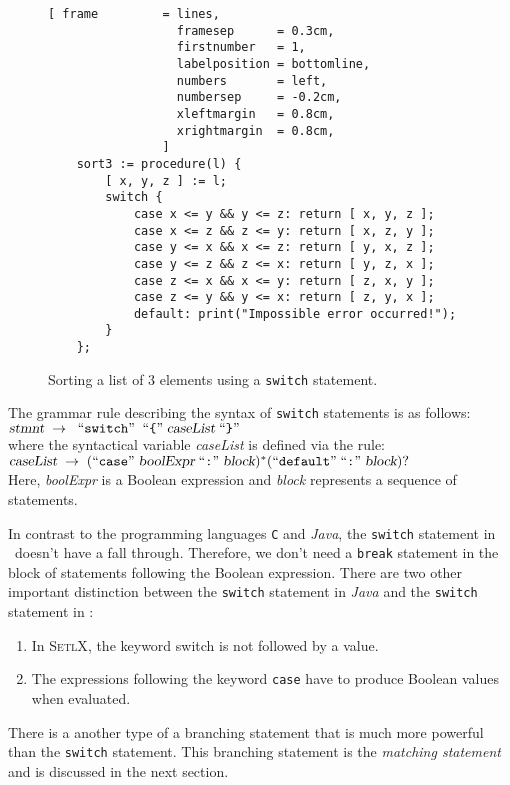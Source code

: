 \begin{figure}[!ht]
\centering
\begin{Verbatim}[ frame         = lines, 
                  framesep      = 0.3cm, 
                  firstnumber   = 1,
                  labelposition = bottomline,
                  numbers       = left,
                  numbersep     = -0.2cm,
                  xleftmargin   = 0.8cm,
                  xrightmargin  = 0.8cm,
                ]
    sort3 := procedure(l) {
        [ x, y, z ] := l;
        switch {
            case x <= y && y <= z: return [ x, y, z ];
            case x <= z && z <= y: return [ x, z, y ];
            case y <= x && x <= z: return [ y, x, z ];
            case y <= z && z <= x: return [ y, z, x ];
            case z <= x && x <= y: return [ z, x, y ];
            case z <= y && y <= x: return [ z, y, x ];
            default: print("Impossible error occurred!");
        }
    };
\end{Verbatim}
\vspace*{-0.3cm}
\caption{Sorting a list of 3 elements using a \texttt{switch} statement.}
\label{fig:sort3switch.stlx}
\end{figure}
\noindent
The grammar rule describing the syntax of \texttt{switch} statements is as follows:
\\[0.2cm]
\hspace*{1.3cm}
$\textsl{stmnt} \;\rightarrow\; \;\mbox{``\texttt{switch}''}\; \;\mbox{``\texttt{\{}''}\; \textsl{caseList} \;\mbox{``\texttt{\}}''}\;$
\\[0.2cm]
where the syntactical variable \textsl{caseList} is defined via the rule:
\\[0.2cm]
\hspace*{1.3cm}
$\textsl{caseList} \;\rightarrow\; (\mbox{``\texttt{case}''}\; \textsl{boolExpr} \;\mbox{``\texttt{:}''}\; \textsl{block})^* 
 (\mbox{``\texttt{default}''} \;\mbox{``\texttt{:}''}\; \textsl{block})?$
\\[0.2cm]
Here, \textsl{boolExpr} is a Boolean expression and \textsl{block} represents a sequence of statements.

In contrast to the programming languages \texttt{C} and \textsl{Java}, the \texttt{switch}
statement in \setlx\ doesn't have a fall through.  Therefore, we don't need a \texttt{break} statement in the
block of statements following the Boolean expression.  
There are two other important distinction between the \texttt{switch} statement in
\textsl{Java} and the \texttt{switch} statement in \setlx:  
\begin{enumerate}
\item In \textsc{SetlX}, the keyword switch is not followed by a value.
\item The expressions following the keyword \texttt{case} have to produce Boolean values when evaluated.  
\end{enumerate}
There is a another type of a branching statement that is much more powerful than the \texttt{switch}
statement.  This branching statement is the \emph{matching statement} and is discussed in the next section.

